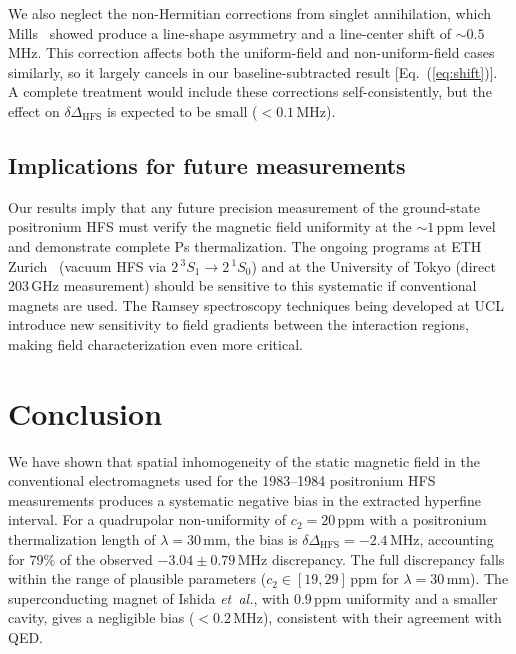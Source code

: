 \documentclass[twocolumn,pra,aps,superscriptaddress,floatfix,10pt]{revtex4-2}
\begin{document}
We also neglect the non-Hermitian corrections from singlet annihilation, which Mills~\cite{Mills1983} showed produce a line-shape asymmetry and a line-center shift of $\sim 0.5$\,MHz. This correction affects both the uniform-field and non-uniform-field cases similarly, so it largely cancels in our baseline-subtracted result [Eq.~(\ref{eq:shift})]. A complete treatment would include these corrections self-consistently, but the effect on $\delta\Delta_\mathrm{HFS}$ is expected to be small ($< 0.1$\,MHz).

\subsection{Implications for future measurements}

Our results imply that any future precision measurement of the ground-state positronium HFS must verify the magnetic field uniformity at the $\sim 1$\,ppm level and demonstrate complete Ps thermalization. The ongoing programs at ETH Zurich~\cite{ThorpeWoods2026} (vacuum HFS via $2\,^3S_1 \to 2\,^1S_0$) and at the University of Tokyo (direct 203\,GHz measurement) should be sensitive to this systematic if conventional magnets are used. The Ramsey spectroscopy techniques being developed at UCL~\cite{Newson2026} introduce new sensitivity to field gradients between the interaction regions, making field characterization even more critical.

\section{Conclusion}
\label{sec:conclusion}

We have shown that spatial inhomogeneity of the static magnetic field in the conventional electromagnets used for the 1983--1984 positronium HFS measurements produces a systematic negative bias in the extracted hyperfine interval. For a quadrupolar non-uniformity of $c_2 = 20$\,ppm with a positronium thermalization length of $\lambda = 30$\,mm, the bias is $\delta\Delta_\mathrm{HFS} = -2.4$\,MHz, accounting for $79\%$ of the observed $-3.04 \pm 0.79$\,MHz discrepancy. The full discrepancy falls within the range of plausible parameters ($c_2 \in [19, 29]$\,ppm for $\lambda = 30$\,mm). The superconducting magnet of Ishida \textit{et~al.}, with 0.9\,ppm uniformity and a smaller cavity, gives a negligible bias ($< 0.2$\,MHz), consistent with their agreement with QED.
\end{document}
